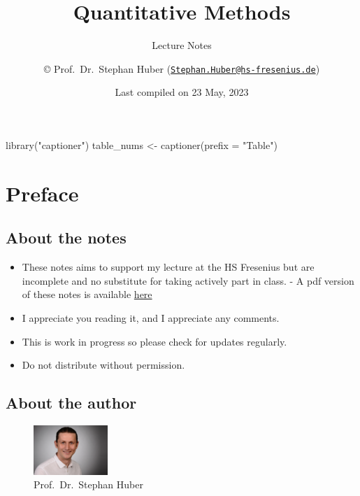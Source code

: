 \documentclass[
  12pt,
  oneside]{book}
\title{Quantitative Methods}
\subtitle{Lecture Notes}
\author{© Prof.~Dr.~Stephan Huber (\href{mailto:Stephan.Huber@hs-fresenius.de}{\nolinkurl{Stephan.Huber@hs-fresenius.de}})}
\date{Last compiled on 23 May, 2023}
\newenvironment{Shaded}{\begin{snugshade}}{\end{snugshade}}
\newcommand{\AttributeTok}[1]{\textcolor[rgb]{0.77,0.63,0.00}{#1}}
\newcommand{\FunctionTok}[1]{\textcolor[rgb]{0.00,0.00,0.00}{#1}}
\newcommand{\NormalTok}[1]{#1}
\newcommand{\OtherTok}[1]{\textcolor[rgb]{0.56,0.35,0.01}{#1}}
\newcommand{\StringTok}[1]{\textcolor[rgb]{0.31,0.60,0.02}{#1}}
\providecommand{\tightlist}{%
  \setlength{\itemsep}{0pt}\setlength{\parskip}{0pt}}
\theoremstyle{definition}
\theoremstyle{definition}
\theoremstyle{definition}
\theoremstyle{definition}
\theoremstyle{remark}
\begin{document}
\maketitle

{
\hypersetup{linkcolor=}
\setcounter{tocdepth}{2}
\tableofcontents
}
\begin{Shaded}
\begin{Highlighting}[]
\FunctionTok{library}\NormalTok{(}\StringTok{"captioner"}\NormalTok{)}
\NormalTok{table\_nums }\OtherTok{\textless{}{-}} \FunctionTok{captioner}\NormalTok{(}\AttributeTok{prefix =} \StringTok{"Table"}\NormalTok{)}
\end{Highlighting}
\end{Shaded}

\hypertarget{preface}{%
\chapter*{Preface}\label{preface}}

\hypertarget{about-the-notes}{%
\section*{About the notes}\label{about-the-notes}}

\begin{itemize}
\tightlist
\item
  These notes aims to support my lecture at the HS Fresenius but are incomplete and no substitute for taking actively part in class. - A pdf version of these notes is available \href{https://raw.githubusercontent.com/hubchev/hubchev.github.io/main/qm/_main.pdf}{here}
\item
  I appreciate you reading it, and I appreciate any comments.
\item
  This is work in progress so please check for updates regularly.
\item
  Do not distribute without permission.
\end{itemize}

\hypertarget{about-the-author}{%
\section*{About the author}\label{about-the-author}}

\begin{figure}
\centering
\includegraphics[width=0.25\textwidth,height=\textheight]{fig/huber2.jpeg}
\caption[\label{fig:itsme} Prof.~Dr.~Stephan Huber]{\label{fig:itsme} Prof.~Dr.~Stephan Huber\footnotemark{}}
\end{figure}
\end{document}
